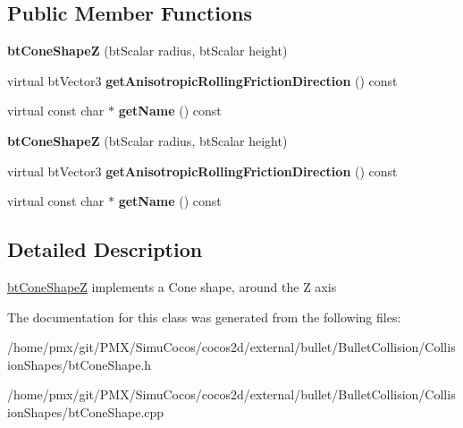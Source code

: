 \subsection*{Public Member Functions}
\begin{DoxyCompactItemize}
\item 
\mbox{\label{classbtConeShapeZ_a6974d856cbe1e0104133e68f07e92772}} 
{\bfseries bt\+Cone\+ShapeZ} (bt\+Scalar radius, bt\+Scalar height)
\item 
\mbox{\label{classbtConeShapeZ_a02ae47533abe78ddd80013f04d12bba9}} 
virtual bt\+Vector3 {\bfseries get\+Anisotropic\+Rolling\+Friction\+Direction} () const
\item 
\mbox{\label{classbtConeShapeZ_a1589721b82ccb2d511d23882a5a7b815}} 
virtual const char $\ast$ {\bfseries get\+Name} () const
\item 
\mbox{\label{classbtConeShapeZ_a6974d856cbe1e0104133e68f07e92772}} 
{\bfseries bt\+Cone\+ShapeZ} (bt\+Scalar radius, bt\+Scalar height)
\item 
\mbox{\label{classbtConeShapeZ_a02ae47533abe78ddd80013f04d12bba9}} 
virtual bt\+Vector3 {\bfseries get\+Anisotropic\+Rolling\+Friction\+Direction} () const
\item 
\mbox{\label{classbtConeShapeZ_a1589721b82ccb2d511d23882a5a7b815}} 
virtual const char $\ast$ {\bfseries get\+Name} () const
\end{DoxyCompactItemize}


\subsection{Detailed Description}
\hyperlink{classbtConeShapeZ}{bt\+Cone\+ShapeZ} implements a Cone shape, around the Z axis 

The documentation for this class was generated from the following files\+:\begin{DoxyCompactItemize}
\item 
/home/pmx/git/\+P\+M\+X/\+Simu\+Cocos/cocos2d/external/bullet/\+Bullet\+Collision/\+Collision\+Shapes/bt\+Cone\+Shape.\+h\item 
/home/pmx/git/\+P\+M\+X/\+Simu\+Cocos/cocos2d/external/bullet/\+Bullet\+Collision/\+Collision\+Shapes/bt\+Cone\+Shape.\+cpp\end{DoxyCompactItemize}
